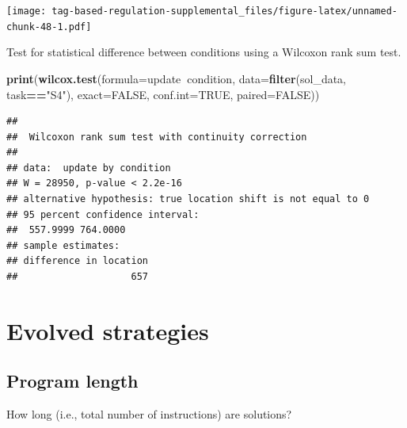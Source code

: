 \documentclass[]{book}
\newenvironment{Shaded}{\begin{snugshade}}{\end{snugshade}}
\newcommand{\DataTypeTok}[1]{\textcolor[rgb]{0.13,0.29,0.53}{#1}}
\newcommand{\KeywordTok}[1]{\textcolor[rgb]{0.13,0.29,0.53}{\textbf{#1}}}
\newcommand{\NormalTok}[1]{#1}
\newcommand{\OperatorTok}[1]{\textcolor[rgb]{0.81,0.36,0.00}{\textbf{#1}}}
\newcommand{\OtherTok}[1]{\textcolor[rgb]{0.56,0.35,0.01}{#1}}
\newcommand{\StringTok}[1]{\textcolor[rgb]{0.31,0.60,0.02}{#1}}
\begin{document}
\texttt{[image: tag-based-regulation-supplemental\_files/figure-latex/unnamed-chunk-48-1.pdf]}

Test for statistical difference between conditions using a Wilcoxon rank sum test.

\begin{Shaded}
\begin{Highlighting}[]
\KeywordTok{print}\NormalTok{(}\KeywordTok{wilcox.test}\NormalTok{(}\DataTypeTok{formula=}\NormalTok{update}\OperatorTok{~}\NormalTok{condition, }\DataTypeTok{data=}\KeywordTok{filter}\NormalTok{(sol_data, task}\OperatorTok{==}\StringTok{"S4"}\NormalTok{), }\DataTypeTok{exact=}\OtherTok{FALSE}\NormalTok{, }\DataTypeTok{conf.int=}\OtherTok{TRUE}\NormalTok{, }\DataTypeTok{paired=}\OtherTok{FALSE}\NormalTok{))}
\end{Highlighting}
\end{Shaded}

\begin{verbatim}
## 
##  Wilcoxon rank sum test with continuity correction
## 
## data:  update by condition
## W = 28950, p-value < 2.2e-16
## alternative hypothesis: true location shift is not equal to 0
## 95 percent confidence interval:
##  557.9999 764.0000
## sample estimates:
## difference in location 
##                    657
\end{verbatim}

\hypertarget{evolved-strategies}{%
\section{Evolved strategies}\label{evolved-strategies}}

\hypertarget{program-length-1}{%
\subsection{Program length}\label{program-length-1}}

How long (i.e., total number of instructions) are solutions?
\end{document}
